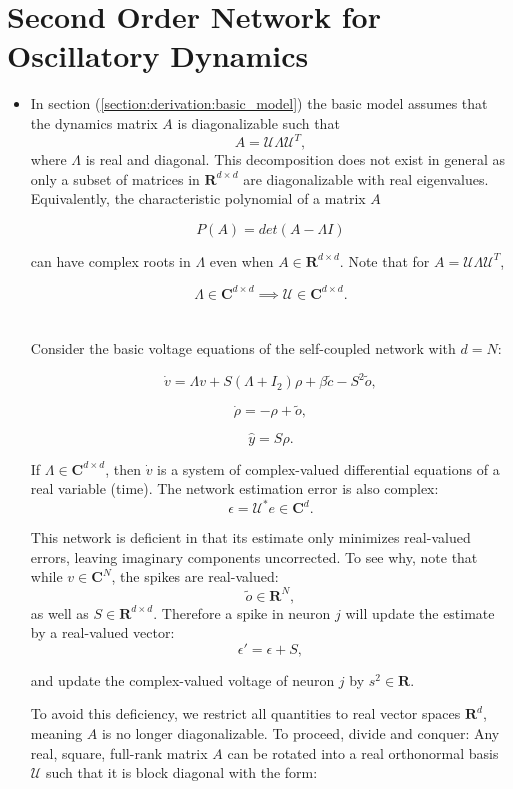 \section{Second Order Network for Oscillatory Dynamics}

\begin{itemize}


\item In section (\ref{section:derivation:basic_model}) the basic model assumes that the dynamics matrix $A$ is diagonalizable such that 
$$
A = \mathcal{U} \Lambda \mathcal{U}^T, 
$$
where $\Lambda$ is real and diagonal. This decomposition does not exist in general as only a subset of matrices in $\mathbf{R}^{d \times d}$ are diagonalizable with real eigenvalues. Equivalently, the characteristic polynomial of a matrix $A$

$$
P(A) = det(A - \Lambda I)
$$

can have complex roots in $\Lambda$ even when $A \in \mathbf{R}^{d \times d}$. Note that for $A = \mathcal{U}\Lambda \mathcal{U}^T$,

$$
\Lambda \in \mathbf{C}^{d \times d} \implies \mathcal{U}\in \mathbf{C}^{d \times d}.
$$
\\
\\
Consider the basic voltage equations of the self-coupled network with $d = N$:

$$
\dot{v}
= 
\Lambda
v +
S \left(\Lambda + I_2 \right)
  \rho 
+ \beta \tilde{c}  
  - 
S^2 
    \tilde{o},
$$

$$
\dot{\rho} = -\rho + \tilde{o},
$$

$$
\hat{y} = 
S
\rho.
$$


If $\Lambda \in \mathbf{C}^{d \times d}$, then $\dot{v}$ is a system of complex-valued differential equations of a real variable (time). The network estimation error is also complex:
$$
\epsilon = \mathcal{U}^* e \in \mathbf{C}^d.
$$

This network is deficient in that its estimate only minimizes real-valued errors, leaving imaginary components uncorrected. To see why, note that while $v \in \mathbf{C}^N$, the spikes are real-valued: 
$$
\tilde{o} \in \mathbf{R}^N,
$$
as well as $S \in \mathbf{R}^{d \times d}$. Therefore a spike in neuron $j$ will update the estimate by a real-valued vector:
$$
\epsilon'  = \epsilon + S,
$$

and update the complex-valued voltage of neuron $j$ by $s^2 \in \mathbf{R}$.


To avoid this deficiency, we restrict all quantities to real vector spaces $\mathbf{R}^d$, meaning $A$ is no longer diagonalizable. To proceed, divide and conquer: Any real, square, full-rank matrix $A$ can be rotated into a real orthonormal basis $\mathcal{U}$ such that it is block diagonal with the form:


\end{itemize}
